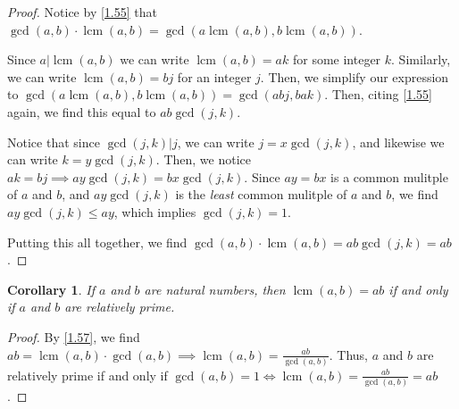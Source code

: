\documentclass{article}
\DeclareMathOperator{\lcm}{lcm}
\newtheorem{cor}[thm]{Corollary}
\numberwithin{equation}{thm}
\begin{document}
\begin{proof}
  Notice by \ref{1.55} that $\gcd (a, b) \cdot \lcm (a, b) = \gcd (a \lcm (a, b), b \lcm (a, b))$.

  Since $a | \lcm (a,b)$ we can write $\lcm (a, b) = ak$ for some integer $k$. Similarly, we can write $\lcm (a, b) = bj$ for an integer $j$. Then, we simplify our expression to $\gcd (a \lcm (a, b), b \lcm (a, b)) = \gcd( abj, bak)$. Then, citing \ref{1.55} again, we find this equal to $ab \gcd(j, k)$.

  Notice that since $\gcd (j, k) | j$, we can write $j = x \gcd(j, k)$, and likewise we can write $k = y \gcd (j, k)$. Then, we notice $ak = bj \implies ay \gcd (j, k) = bx \gcd(j, k)$. Since $ay = bx$ is a common mulitple of $a$ and $b$, and $ay \gcd (j, k)$ is the \emph{least} common mulitple of $a$ and $b$, we find $ay \gcd (j, k) \leq ay$, which implies $\gcd (j, k) = 1$.

  Putting this all together, we find $\gcd (a, b) \cdot \lcm (a, b) = ab \gcd (j, k) = ab$.
\end{proof}



\begin{cor} \label{1.58}
  If $a$ and $b$ are natural numbers, then $\lcm (a, b) = ab$ if and only if $a$ and $b$ are relatively prime.
\end{cor}

\begin{proof}
  By \ref{1.57}, we find $ab = \lcm (a, b)  \cdot \gcd (a, b) \implies \lcm (a, b) = \frac{ab}{\gcd(a, b)}$. Thus, $a$ and $b$ are relatively prime if and only if $\gcd (a, b) = 1 \iff \lcm (a, b) = \frac{ab}{\gcd (a, b)} = ab$.
\end{proof}
\end{document}
